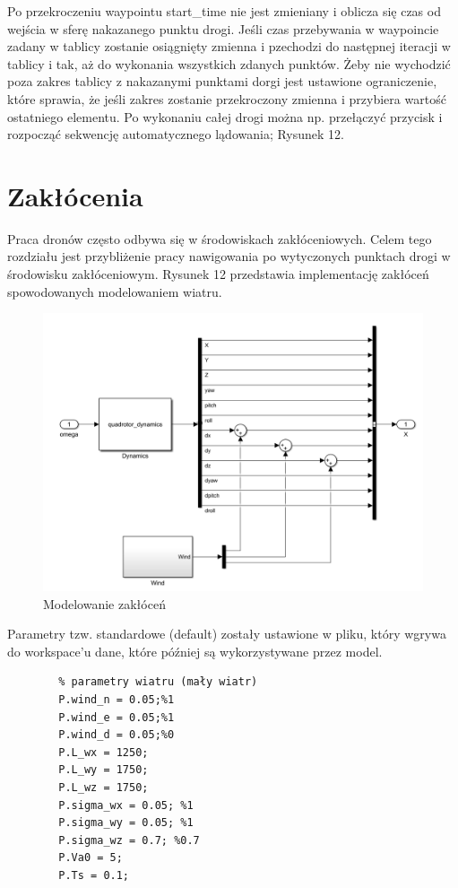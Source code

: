 \documentclass[polish,11pt,a4paper]{article}
\begin{document}
Po przekroczeniu waypointu start\_time nie jest zmieniany i oblicza się czas
od wejścia w sferę nakazanego punktu drogi. Jeśli czas przebywania w waypoincie zadany w tablicy zostanie osiągnięty
zmienna i pzechodzi do następnej iteracji w tablicy i tak, aż do wykonania wszystkich zdanych punktów. Żeby nie wychodzić poza 
zakres tablicy z nakazanymi punktami dorgi jest ustawione ograniczenie, które sprawia, że jeśli zakres zostanie przekroczony 
zmienna i przybiera wartość ostatniego elementu. Po wykonaniu całej drogi można np. przełączyć przycisk i rozpocząć
sekwencję automatycznego lądowania; Rysunek 12.

\section*{Zakłócenia}
Praca dronów często odbywa się w środowiskach zakłóceniowych. Celem tego rozdziału jest przybliżenie pracy nawigowania po wytyczonych punktach drogi w środowisku zakłóceniowym. Rysunek 12 przedstawia implementację zakłóceń spowodowanych modelowaniem wiatru. 
\begin{figure}[H]
	\centering
	\includegraphics[width=1\linewidth]{wiatr/sch-w}
	\caption{Modelowanie zakłóceń}
	\label{fig:sch-w}
\end{figure}
Parametry tzw. standardowe (default) zostały ustawione w pliku, który wgrywa do workspace'u dane, które później są wykorzystywane przez model.

\begin{footnotesize}
	\begin{verbatim}
		% parametry wiatru (mały wiatr)
		P.wind_n = 0.05;%1
		P.wind_e = 0.05;%1
		P.wind_d = 0.05;%0
		P.L_wx = 1250;
		P.L_wy = 1750;
		P.L_wz = 1750;
		P.sigma_wx = 0.05; %1
		P.sigma_wy = 0.05; %1
		P.sigma_wz = 0.7; %0.7
		P.Va0 = 5;
		P.Ts = 0.1;
	\end{verbatim}
\end{footnotesize}
\end{document}
